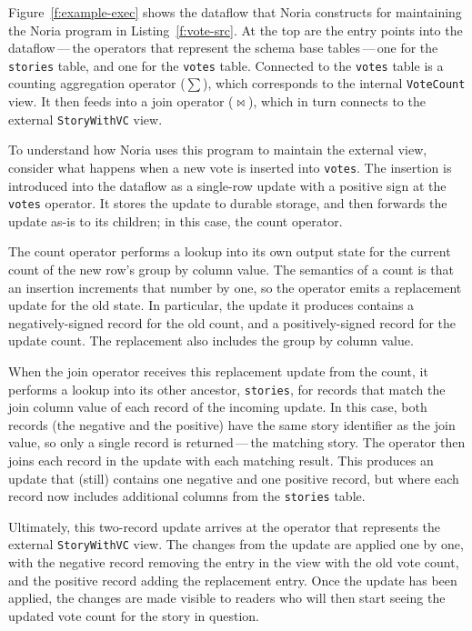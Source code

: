 Figure~\ref{f:example-exec} shows the dataflow that Noria constructs for
maintaining the Noria program in Listing~\ref{f:vote-src}. At the top are the
entry points into the dataflow\,---\,the operators that represent the schema
base tables\,---\,one for the \texttt{stories} table, and one for the
\texttt{votes} table. Connected to the \texttt{votes} table is a counting
aggregation operator ($\sum$), which corresponds to the internal
\texttt{VoteCount} view. It then feeds into a join operator ($\bowtie$), which
in turn connects to the external \texttt{StoryWithVC} view.

To understand how Noria uses this program to maintain the external view,
consider what happens when a new vote is inserted into \texttt{votes}. The
insertion is introduced into the dataflow as a single-row update with a positive
sign at the \texttt{votes} operator. It stores the update to durable storage,
and then forwards the update as-is to its children; in this case, the count
operator.

The count operator performs a lookup into its own output state for the current
count of the new row's group by column value. The semantics of a count is that
an insertion increments that number by one, so the operator emits a replacement
update for the old state. In particular, the update it produces contains a
negatively-signed record for the old count, and a positively-signed record for
the update count. The replacement also includes the group by column value.

When the join operator receives this replacement update from the count, it
performs a lookup into its other ancestor, \texttt{stories}, for records that
match the join column value of each record of the incoming update. In this case,
both records (the negative and the positive) have the same story identifier as
the join value, so only a single record is returned\,---\,the matching story.
The operator then joins each record in the update with each matching result.
This produces an update that (still) contains one negative and one positive
record, but where each record now includes additional columns from the
\texttt{stories} table.

Ultimately, this two-record update arrives at the operator that represents the
external \texttt{StoryWithVC} view. The changes from the update are applied one
by one, with the negative record removing the entry in the view with the old
vote count, and the positive record adding the replacement entry. Once the
update has been applied, the changes are made visible to readers who will then
start seeing the updated vote count for the story in question.

